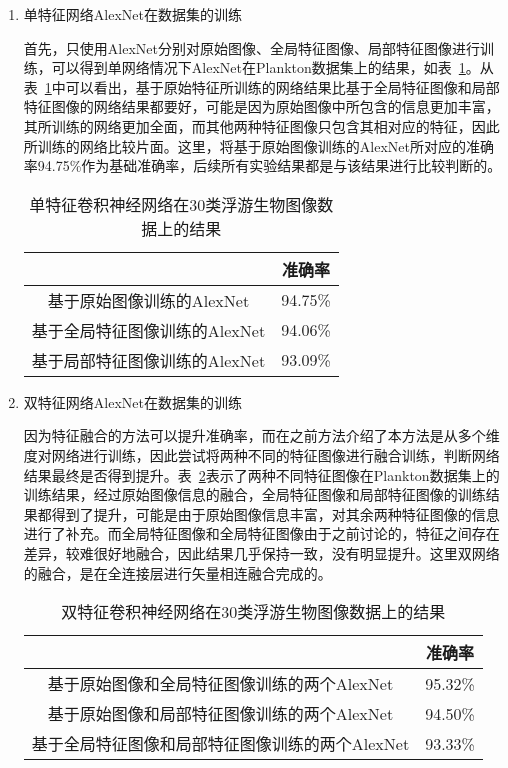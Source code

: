 \begin{enumerate}
\item 单特征网络AlexNet在数据集的训练

首先，只使用AlexNet分别对原始图像、全局特征图像、局部特征图像进行训练，可以得到单网络情况下AlexNet在Plankton数据集上的结果，如表~\ref{tab:single}。从表~\ref{tab:single}中可以看出，基于原始特征所训练的网络结果比基于全局特征图像和局部特征图像的网络结果都要好，可能是因为原始图像中所包含的信息更加丰富，其所训练的网络更加全面，而其他两种特征图像只包含其相对应的特征，因此所训练的网络比较片面。这里，将基于原始图像训练的AlexNet所对应的准确率94.75\%作为基础准确率，后续所有实验结果都是与该结果进行比较判断的。


\begin{table}[H]
\centering
\caption{单特征卷积神经网络在30类浮游生物图像数据上的结果}
\label{tab:single}
\begin{tabular}{|c|c|}%
\hline
\centering{网络模型} & 准确率 \\
\hline
基于原始图像训练的AlexNet & 94.75\% \\ 
\hline
基于全局特征图像训练的AlexNet  & 94.06\% \\ 
\hline
基于局部特征图像训练的AlexNet  & 93.09\% \\
\hline
\end{tabular}
\end{table}

\item 双特征网络AlexNet在数据集的训练

因为特征融合的方法可以提升准确率，而在之前方法介绍了本方法是从多个维度对网络进行训练，因此尝试将两种不同的特征图像进行融合训练，判断网络结果最终是否得到提升。表~\ref{tab:double}表示了两种不同特征图像在Plankton数据集上的训练结果，经过原始图像信息的融合，全局特征图像和局部特征图像的训练结果都得到了提升，可能是由于原始图像信息丰富，对其余两种特征图像的信息进行了补充。而全局特征图像和全局特征图像由于之前讨论的，特征之间存在差异，较难很好地融合，因此结果几乎保持一致，没有明显提升。这里双网络的融合，是在全连接层进行矢量相连融合完成的。

\begin{table}[H]
\centering
\caption{双特征卷积神经网络在30类浮游生物图像数据上的结果}
\label{tab:double}
\begin{tabular}{|c|c|}%
\hline
\centering{网络模型} & 准确率 \\
\hline
基于原始图像和全局特征图像训练的两个AlexNet & 95.32\% \\ 
\hline
基于原始图像和局部特征图像训练的两个AlexNet  & 94.50\% \\ 
\hline
基于全局特征图像和局部特征图像训练的两个AlexNet  & 93.33\% \\
\hline
\end{tabular}
\end{table}


\end{enumerate}

